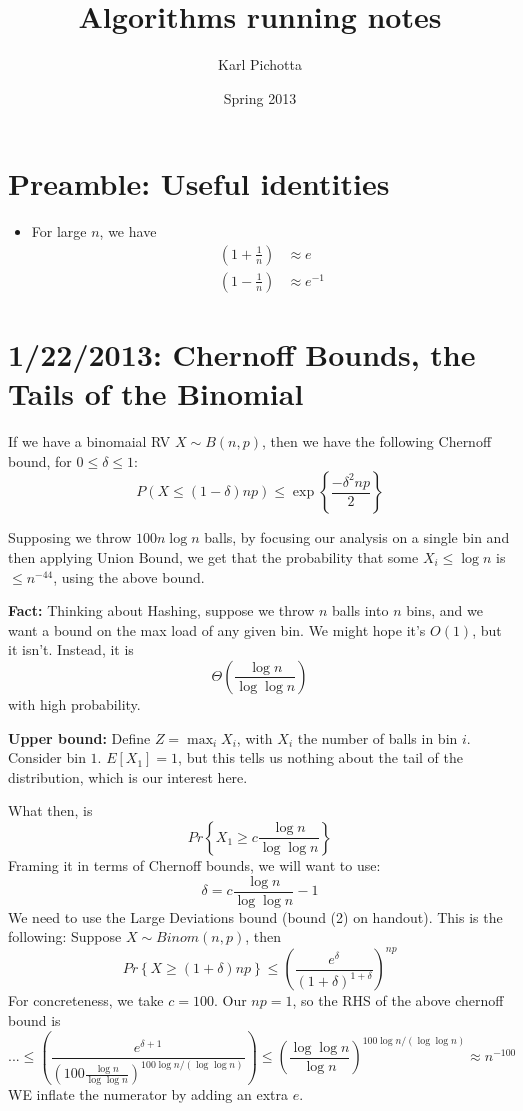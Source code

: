 \documentclass{article}
\title{Algorithms running notes}
\author{Karl Pichotta}
\date{Spring 2013}
\newcommand{\inv}{^{-1}}
\begin{document}
\maketitle

\section{Preamble: Useful identities}

\begin{itemize}

	\item
	For large $n$, we have
	\begin{align}
		\left(
			1 + \frac{1}{n}
		\right)
		&\approx 
		e
		\\
		\left(
			1 - \frac{1}{n}
		\right)
		&\approx 
		e\inv
	\end{align}

\end{itemize}

\section{1/22/2013: Chernoff Bounds, the Tails of the Binomial}

If we have a  binomaial RV $X\sim B(n,p)$, then we have the following
 Chernoff bound, for $0\leq \delta \leq 1$:
$$
P(X\leq (1-\delta) np) \leq
\exp\left\{
	\frac{-\delta^2 np} {2}
\right\}
$$

Supposing we throw $100 n\log n$ balls, by focusing our analysis on a single bin
and then applying Union Bound, we get that the probability that 
some $X_i \leq \log n$ is $\leq n^{-44}$, using the above bound.

\textbf{Fact:}
Thinking about Hashing, suppose we throw $n$ balls into $n$ bins, and we want a bound on the max load of any given bin.
We might hope it's $O(1)$, but it isn't.
Instead, it is
$$
\Theta\left(
	\frac{\log n} {\log \log n}
\right)
$$
with high probability.

\textbf{Upper bound:}
Define $Z = \max_i X_i$, with $X_i$ the number of balls in bin $i$.
Consider bin $1$.
$E[X_1] = 1$, but this tells us nothing about the tail of the distribution,
which is our interest here.

What then, is
$$
Pr\left\{
	X_1 \geq c\frac{\log n}{ \log\log n}
\right\}
$$
Framing it in terms of Chernoff bounds, we will want to use:
$$
\delta = c\frac{\log n}{ \log\log n} - 1 
$$
We need to use the Large Deviations bound (bound (2) on handout).
This is the following:
Suppose $X\sim Binom(n,p)$, then
$$
Pr\left\{
	X\geq (1 + \delta) np
\right\}
\leq
\left(
	\frac{e^\delta}{(1+\delta)^{1+\delta}}
\right)
^{np}
$$
For concreteness, we take $c=100$.
Our $np=1$, so the RHS of the above chernoff bound is
$$
... \leq
\left(
\frac{e^{\delta + 1}}
{	\left(100 \frac{\log n}{\log \log n} \right) ^ {100 \log n / (\log \log n)}}
\right) 
\leq
\left(
	\frac{\log\log n}{\log n}
\right) ^ {100 \log n / (\log \log n)}
\approx
n^{-100}
$$
WE inflate the numerator by adding an extra $e$.
\end{document}
